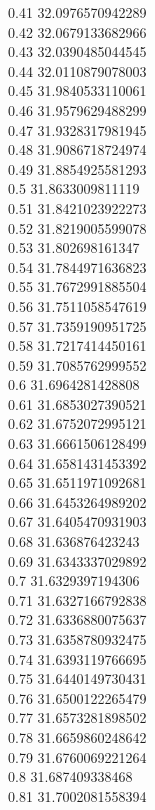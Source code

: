 {0.41	32.0976570942289\\
0.42	32.0679133682966\\
0.43	32.0390485044545\\
0.44	32.0110879078003\\
0.45	31.9840533110061\\
0.46	31.9579629488299\\
0.47	31.9328317981945\\
0.48	31.9086718724974\\
0.49	31.8854925581293\\
0.5	31.8633009811119\\
0.51	31.8421023922273\\
0.52	31.8219005599078\\
0.53	31.802698161347\\
0.54	31.7844971636823\\
0.55	31.7672991885504\\
0.56	31.7511058547619\\
0.57	31.7359190951725\\
0.58	31.7217414450161\\
0.59	31.7085762999552\\
0.6	31.6964281428808\\
0.61	31.6853027390521\\
0.62	31.6752072995121\\
0.63	31.6661506128499\\
0.64	31.6581431453392\\
0.65	31.6511971092681\\
0.66	31.6453264989202\\
0.67	31.6405470931903\\
0.68	31.636876423243\\
0.69	31.6343337029892\\
0.7	31.6329397194306\\
0.71	31.6327166792838\\
0.72	31.6336880075637\\
0.73	31.6358780932475\\
0.74	31.6393119766695\\
0.75	31.6440149730431\\
0.76	31.6500122265479\\
0.77	31.6573281898502\\
0.78	31.6659860248642\\
0.79	31.6760069221264\\
0.8	31.687409338468\\
0.81	31.7002081558394\\
}

